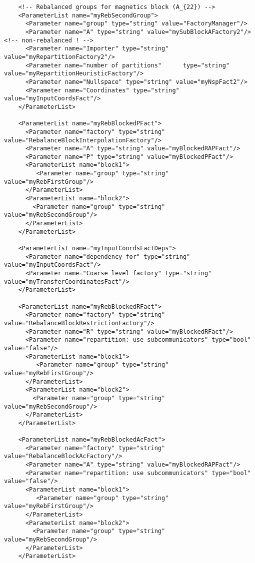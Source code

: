 \documentclass[10pt,fleqn]{book}
\begin{document}
\begin{lstlisting}
    <!-- Rebalanced groups for magnetics block (A_{22}) -->
    <ParameterList name="myRebSecondGroup">
      <Parameter name="group" type="string" value="FactoryManager"/>
      <Parameter name="A" type="string" value="mySubBlockAFactory2"/> <!-- non-rebalanced ! -->
      <Parameter name="Importer" type="string" value="myRepartitionFactory2"/>
      <Parameter name="number of partitions"      type="string"  value="myRepartitionHeuristicFactory"/>
      <Parameter name="Nullspace" type="string" value="myNspFact2"/>
      <Parameter name="Coordinates" type="string" value="myInputCoordsFact"/>
    </ParameterList>  

    <ParameterList name="myRebBlockedPFact">
      <Parameter name="factory" type="string" value="RebalanceBlockInterpolationFactory"/>
      <Parameter name="A" type="string" value="myBlockedRAPFact"/>
      <Parameter name="P" type="string" value="myBlockedPFact"/>
      <ParameterList name="block1">
         <Parameter name="group" type="string" value="myRebFirstGroup"/>
      </ParameterList>
      <ParameterList name="block2">
        <Parameter name="group" type="string" value="myRebSecondGroup"/>
      </ParameterList>      
    </ParameterList>    
   
    <ParameterList name="myInputCoordsFactDeps">
      <Parameter name="dependency for" type="string" value="myInputCoordsFact"/>
      <Parameter name="Coarse level factory" type="string" value="myTransferCoordinatesFact"/>
    </ParameterList>

    <ParameterList name="myRebBlockedRFact">
      <Parameter name="factory" type="string" value="RebalanceBlockRestrictionFactory"/>
      <Parameter name="R" type="string" value="myBlockedRFact"/>
      <Parameter name="repartition: use subcommunicators" type="bool" value="false"/>
      <ParameterList name="block1">
         <Parameter name="group" type="string" value="myRebFirstGroup"/>
      </ParameterList>
      <ParameterList name="block2">
        <Parameter name="group" type="string" value="myRebSecondGroup"/>
      </ParameterList>            
    </ParameterList>     
    
    <ParameterList name="myRebBlockedAcFact">
      <Parameter name="factory" type="string" value="RebalanceBlockAcFactory"/>
      <Parameter name="A" type="string" value="myBlockedRAPFact"/>
      <Parameter name="repartition: use subcommunicators" type="bool" value="false"/>
      <ParameterList name="block1">
         <Parameter name="group" type="string" value="myRebFirstGroup"/>
      </ParameterList>
      <ParameterList name="block2">
        <Parameter name="group" type="string" value="myRebSecondGroup"/>
      </ParameterList>            
    </ParameterList> 
    

\end{lstlisting}
\end{document}
